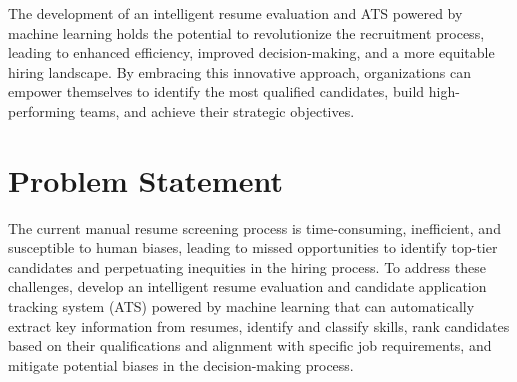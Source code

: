 The development of an intelligent resume evaluation and ATS powered by machine learning holds the potential to revolutionize the recruitment process, leading to enhanced efficiency, improved decision-making, and a more equitable hiring landscape. By embracing this innovative approach, organizations can empower themselves to identify the most qualified candidates, build high-performing teams, and achieve their strategic objectives.

\section{Problem Statement}
The current manual resume screening process is time-consuming, inefficient, and susceptible to human biases, leading to missed opportunities to identify top-tier candidates and perpetuating inequities in the hiring process. To address these challenges, develop an intelligent resume evaluation and candidate application tracking system (ATS) powered by machine learning that can automatically extract key information from resumes, identify and classify skills, rank candidates based on their qualifications and alignment with specific job requirements, and mitigate potential biases in the decision-making process.
